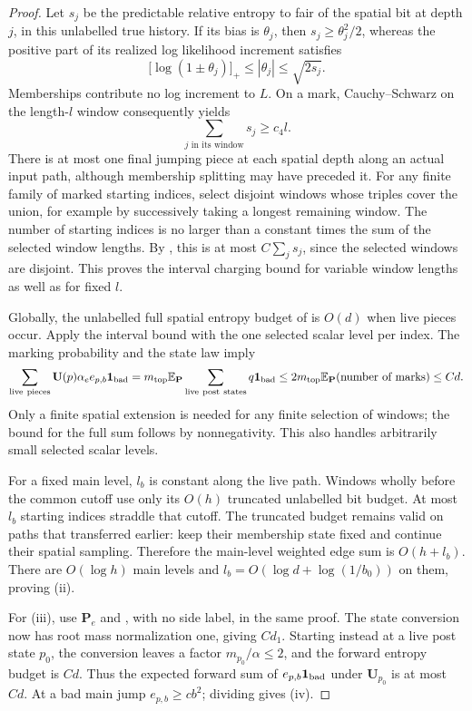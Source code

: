 \begin{proof}
Let $s_j$ be the predictable relative entropy to fair of the spatial bit at
depth $j$, in this unlabelled true history. If its bias is $\theta_j$,
then $s_j\ge\theta_j^2/2$, whereas the positive part of its realized log
likelihood increment satisfies
\[
 \bigl[\log(1\pm\theta_j)\bigr]_+
       \le |\theta_j|\le\sqrt{2s_j}.
\]
Memberships contribute no log increment to $L$. On a mark, Cauchy--Schwarz
on the length-$l$ window consequently yields
\begin{equation}\label{eq:07-marked-window}
 \sum_{j\text{ in its window}}s_j\ge c_4 l.
\end{equation}
There is at most one final jumping piece at each spatial depth along an
actual input path, although membership splitting may have preceded it.
For any finite family of marked starting indices, select disjoint windows
whose triples cover the union, for example by successively taking a longest
remaining window. The number of starting indices is no larger than a
constant times the sum of the selected window lengths. By
, this is at most $C\sum_j s_j$, since the
selected windows are disjoint. This proves the interval charging bound for
variable window lengths as well as for fixed $l$.

Globally, the unlabelled full spatial entropy budget of
 is $O(d)$ when live pieces occur. Apply the
interval bound with the one selected scalar level per index. The marking
probability and the state law imply
\[
 \sum_{\rm live\ pieces}\mathbf U(p)\alpha_e
       e_{p,b}\mathbf1_{\rm bad}
 =m_{\rm top}\mathbb E_{\mathbf P}
       \sum_{\rm live\ post\ states}q\mathbf1_{\rm bad}
 \le2m_{\rm top}\mathbb E_{\mathbf P}(\text{number of marks})
 \le Cd.
\]
Only a finite spatial extension is needed for any finite selection of
windows; the bound for the full sum follows by nonnegativity. This also
handles arbitrarily small selected scalar levels.

For a fixed main level, $l_b$ is constant along the live path. Windows
wholly before the common cutoff use only its $O(h)$ truncated unlabelled
bit budget. At most $l_b$ starting indices straddle that cutoff. The
truncated budget remains valid on paths that transferred earlier: keep
their membership state fixed and continue their spatial sampling. Therefore
the main-level weighted edge sum is $O(h+l_b)$. There are $O(\log h)$ main
levels and $l_b=O(\log d+\log(1/b_0))$ on them, proving (ii).

For (iii), use $\mathbf P_e$ and , with no side
label, in the same proof. The state conversion now has root mass
normalization one, giving $Cd_1$. Starting instead at a live post state
$p_0$, the conversion leaves a factor $m_{p_0}/\alpha\le2$, and the
forward entropy budget is $Cd$. Thus the expected forward sum of
$e_{p,b}\mathbf1_{\rm bad}$ under $\mathbf U_{p_0}$ is at most $Cd$.
At a bad main jump $e_{p,b}\ge cb^2$; dividing gives (iv).
\end{proof}

